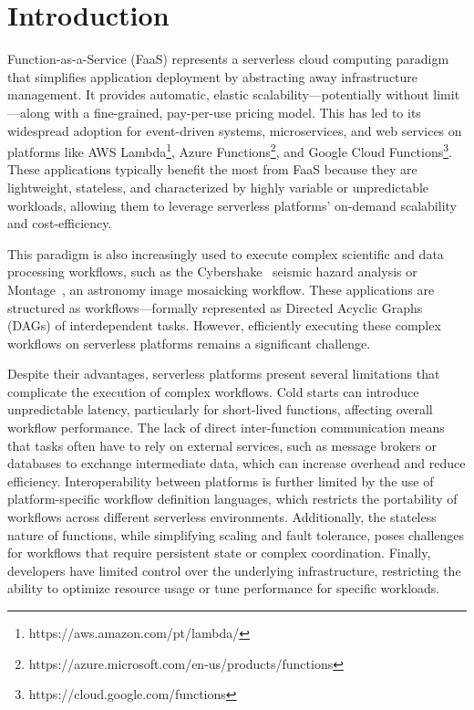 \documentclass[conference]{IEEEtran}
\begin{document}
\section{Introduction}
\label{s:introduction}

Function-as-a-Service (FaaS) represents a serverless cloud computing paradigm that simplifies application deployment by abstracting away infrastructure management. It provides automatic, elastic scalability—potentially without limit—along with a fine-grained, pay-per-use pricing model. This has led to its widespread adoption for event-driven systems, microservices, and web services on platforms like AWS Lambda\footnote{https://aws.amazon.com/pt/lambda/}, Azure Functions\footnote{https://azure.microsoft.com/en-us/products/functions}, and Google Cloud Functions\footnote{https://cloud.google.com/functions}. These applications typically benefit the most from FaaS because they are lightweight, stateless, and characterized by highly variable or unpredictable workloads, allowing them to leverage serverless platforms' on-demand scalability and cost-efficiency.

This paradigm is also increasingly used to execute complex scientific and data processing workflows, such as the Cybershake~\cite{cybershake_workflow} seismic hazard analysis or Montage~\cite{montage_astronomy}, an astronomy image mosaicking workflow. These applications are structured as workflows—formally represented as Directed Acyclic Graphs (DAGs) of interdependent tasks. However, efficiently executing these complex workflows on serverless platforms remains a significant challenge. 

Despite their advantages, serverless platforms present several limitations that complicate the execution of complex workflows. Cold starts can introduce unpredictable latency, particularly for short-lived functions, affecting overall workflow performance. The lack of direct inter-function communication means that tasks often have to rely on external services, such as message brokers or databases to exchange intermediate data, which can increase overhead and reduce efficiency. Interoperability between platforms is further limited by the use of platform-specific workflow definition languages, which restricts the portability of workflows across different serverless environments. Additionally, the stateless nature of functions, while simplifying scaling and fault tolerance, poses challenges for workflows that require persistent state or complex coordination. Finally, developers have limited control over the underlying infrastructure, restricting the ability to optimize resource usage or tune performance for specific workloads.
\end{document}
